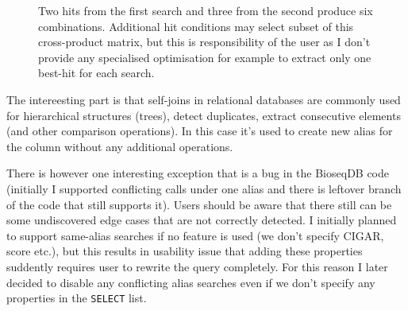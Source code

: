 \begin{figure}[htbp]
\centering
{}
\caption{Two hits from the first search and three from the second
produce six combinations. Additional hit conditions may select subset of this cross-product matrix, but this is responsibility of the user as I don't provide any specialised optimisation for example to extract only one best-hit for each search.}
\label{fig:scan-alias-pairs}
\end{figure}

The intereesting part is that self-joins in relational databases are commonly used for hierarchical structures (trees), detect duplicates, extract consecutive elements (and other comparison operations). In this case it's used to create new alias for the column without any additional operations.

There is however one interesting exception that is a bug in the BioseqDB code (initially I supported conflicting calls under one alias and there is leftover branch of the code that still supports it).
Users should be aware that there still can be some undiscovered edge cases that are not correctly detected.
I initially planned to support same-alias searches if no feature is used (we don't specify CIGAR, score etc.), but this results in usability issue that adding these properties suddently requires user to rewrite the query completely.
For this reason I later decided to disable any conflicting alias searches even if we don't specify any properties in the \texttt{SELECT} list.

